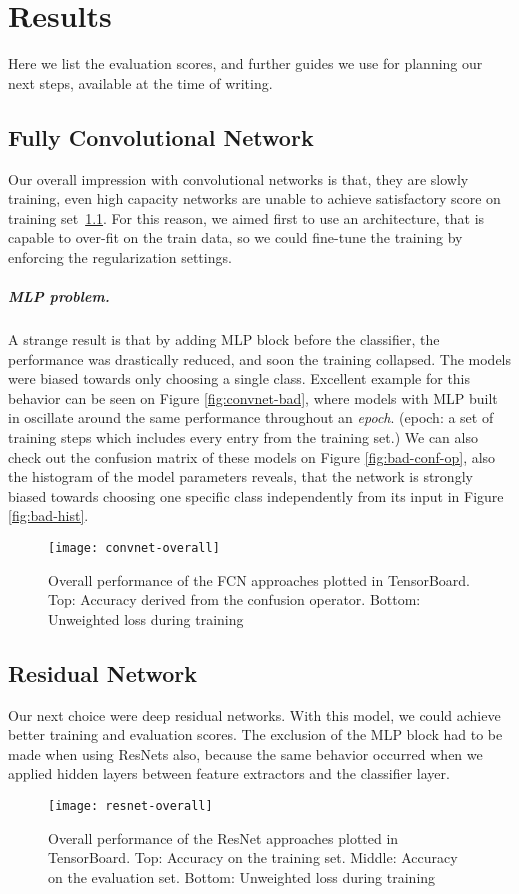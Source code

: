 \chapter{Results}
Here we list the evaluation scores, and further guides we use for planning our next steps, available at the time of writing.

\section{Fully Convolutional Network}
Our overall impression with convolutional networks is that, they are slowly training, even high capacity networks are unable to achieve satisfactory score on training set~\ref{fig:convnet-overall}. For this reason, we aimed first to use an architecture, that is capable to over-fit on the train data, so we could fine-tune the training by enforcing the regularization settings.
\paragraph{MLP problem.}
A strange result is that by adding MLP block before the classifier, the performance was drastically reduced, and soon the training collapsed.
The models were biased towards only choosing a single class.
Excellent example for this behavior can be seen on Figure \ref{fig:convnet-bad}, where models with MLP built in oscillate around the same performance throughout an \textit{epoch}. (epoch: a set of training steps which includes every entry from the training set.)
We can also check out the confusion matrix of these models
on Figure \ref{fig:bad-conf-op}, also the histogram of the model parameters reveals, that the network is strongly biased towards choosing one specific class independently from its input in Figure \ref{fig:bad-hist}.

\begin{figure}[h]
  \centering
  \texttt{[image: convnet-overall]}
  \caption{Overall performance of the FCN approaches plotted in TensorBoard. Top: Accuracy derived from the confusion operator. Bottom: Unweighted loss during training}
  \label{fig:convnet-overall}
\end{figure}

\section{Residual Network}
Our next choice were deep residual networks.
With this model, we could achieve better training and evaluation scores.
The exclusion of the MLP block had to be made when using ResNets also, because the same behavior occurred when we applied hidden layers between feature extractors and the classifier layer.

\begin{figure}[h]
  \centering
  \texttt{[image: resnet-overall]}
  \caption{Overall performance of the ResNet approaches plotted in TensorBoard. Top: Accuracy on the training set. Middle: Accuracy on the evaluation set. Bottom: Unweighted loss during training}
  \label{fig:resnet-overall}
\end{figure}
